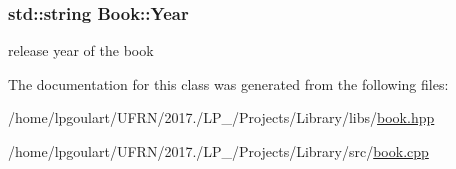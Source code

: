 \subsubsection[{\texorpdfstring{Year}{Year}}]{\setlength{\rightskip}{0pt plus 5cm}std\+::string Book\+::\+Year\hspace{0.3cm}{\ttfamily [private]}}\hypertarget{classBook_ad3fc2c944e788d179c4d836f36662ae2}{}\label{classBook_ad3fc2c944e788d179c4d836f36662ae2}


release year of the book 



The documentation for this class was generated from the following files\+:\begin{DoxyCompactItemize}
\item 
/home/lpgoulart/\+U\+F\+R\+N/2017./\+L\+P\+\_/\+Projects/\+Library/libs/\hyperlink{book_8hpp}{book.\+hpp}\item 
/home/lpgoulart/\+U\+F\+R\+N/2017./\+L\+P\+\_/\+Projects/\+Library/src/\hyperlink{book_8cpp}{book.\+cpp}\end{DoxyCompactItemize}
